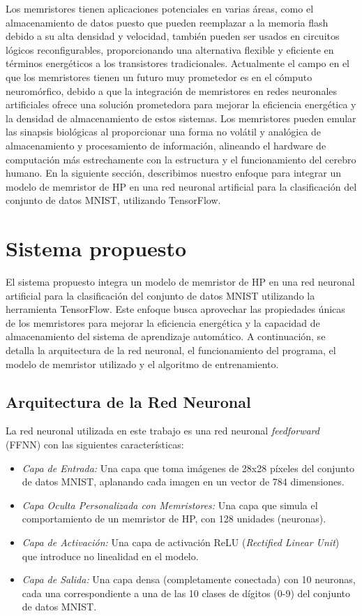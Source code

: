\documentclass[conference]{IEEEtran}
\begin{document}
Los memristores tienen aplicaciones potenciales en varias áreas, como el almacenamiento de datos puesto que pueden reemplazar a la memoria flash debido a su alta densidad y velocidad, también pueden ser usados en circuitos lógicos reconfigurables, proporcionando una alternativa flexible y eficiente en términos energéticos a los transistores tradicionales. Actualmente el campo en el que los memristores tienen un futuro muy prometedor es en el cómputo neuromórfico, debido a que la integración de memristores en redes neuronales artificiales ofrece una solución prometedora para mejorar la eficiencia energética y la densidad de almacenamiento de estos sistemas. Los memristores pueden emular las sinapsis biológicas al proporcionar una forma no volátil y analógica de almacenamiento y procesamiento de información, alineando el hardware de computación más estrechamente con la estructura y el funcionamiento del cerebro humano. En la siguiente sección, describimos nuestro enfoque para integrar un modelo de memristor de HP en una red neuronal artificial para la clasificación del conjunto de datos MNIST, utilizando TensorFlow.

\section{Sistema propuesto}

El sistema propuesto integra un modelo de memristor de HP en una red neuronal artificial para la clasificación del conjunto de datos MNIST utilizando la herramienta TensorFlow. Este enfoque busca aprovechar las propiedades únicas de los memristores para mejorar la eficiencia energética y la capacidad de almacenamiento del sistema de aprendizaje automático. A continuación, se detalla la arquitectura de la red neuronal, el funcionamiento del programa, el modelo de memristor utilizado y el algoritmo de entrenamiento.

\subsection{Arquitectura de la Red Neuronal}
La red neuronal utilizada en este trabajo es una red neuronal \textit{feedforward} (FFNN) con las siguientes características:

\begin{itemize}
	\item \textit{Capa de Entrada:} Una capa que toma imágenes de 28x28 píxeles del conjunto de datos MNIST, aplanando cada imagen en un vector de 784 dimensiones.
	\item \textit{Capa Oculta Personalizada con Memristores:} Una capa que simula el comportamiento de un memristor de HP, con 128 unidades (neuronas).
	\item \textit{Capa de Activación:} Una capa de activación ReLU (\textit{Rectified Linear Unit}) que introduce no linealidad en el modelo.
	\item \textit{Capa de Salida:} Una capa densa (completamente conectada) con 10 neuronas, cada una correspondiente a una de las 10 clases de dígitos (0-9) del conjunto de datos MNIST.
\end{itemize}
\end{document}
